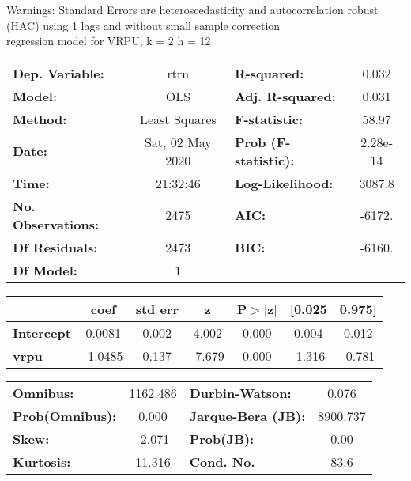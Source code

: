 Warnings: \newline
 [1] Standard Errors are heteroscedasticity and autocorrelation robust (HAC) using 1 lags and without small sample correction\\ 

regression model for VRPU, k = 2 h = 12\begin{center}
\begin{tabular}{lclc}
\toprule
\textbf{Dep. Variable:}    &       rtrn       & \textbf{  R-squared:         } &     0.032   \\
\textbf{Model:}            &       OLS        & \textbf{  Adj. R-squared:    } &     0.031   \\
\textbf{Method:}           &  Least Squares   & \textbf{  F-statistic:       } &     58.97   \\
\textbf{Date:}             & Sat, 02 May 2020 & \textbf{  Prob (F-statistic):} &  2.28e-14   \\
\textbf{Time:}             &     21:32:46     & \textbf{  Log-Likelihood:    } &    3087.8   \\
\textbf{No. Observations:} &        2475      & \textbf{  AIC:               } &    -6172.   \\
\textbf{Df Residuals:}     &        2473      & \textbf{  BIC:               } &    -6160.   \\
\textbf{Df Model:}         &           1      & \textbf{                     } &             \\
\bottomrule
\end{tabular}
\begin{tabular}{lcccccc}
                   & \textbf{coef} & \textbf{std err} & \textbf{z} & \textbf{P$> |$z$|$} & \textbf{[0.025} & \textbf{0.975]}  \\
\midrule
\textbf{Intercept} &       0.0081  &        0.002     &     4.002  &         0.000        &        0.004    &        0.012     \\
\textbf{vrpu}      &      -1.0485  &        0.137     &    -7.679  &         0.000        &       -1.316    &       -0.781     \\
\bottomrule
\end{tabular}
\begin{tabular}{lclc}
\textbf{Omnibus:}       & 1162.486 & \textbf{  Durbin-Watson:     } &    0.076  \\
\textbf{Prob(Omnibus):} &   0.000  & \textbf{  Jarque-Bera (JB):  } & 8900.737  \\
\textbf{Skew:}          &  -2.071  & \textbf{  Prob(JB):          } &     0.00  \\
\textbf{Kurtosis:}      &  11.316  & \textbf{  Cond. No.          } &     83.6  \\
\bottomrule
\end{tabular}
\end{center}


